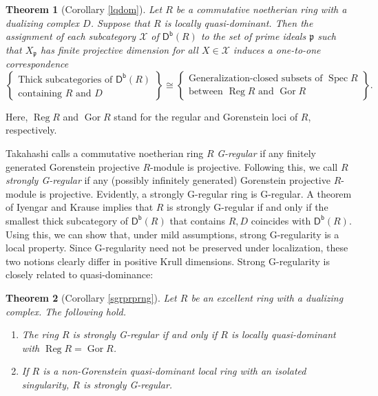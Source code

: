\documentclass{amsart}
\newtheorem{thm}{Theorem}[section]
\theoremstyle{definition}
\theoremstyle{remark}
\numberwithin{equation}{thm}
\def\Db{\operatorname{\mathsf{D^b}}}
\def\gor{\operatorname{Gor}}
\def\p{\mathfrak{p}}
\def\reg{\operatorname{Reg}}
\def\spec{\operatorname{Spec}}
\def\X{\mathcal{X}}
\begin{document}
\begin{thm}[Corollary \ref{lqdom}]\label{main2}
Let $R$ be a commutative noetherian ring with a dualizing complex $D$.
Suppose that $R$ is locally quasi-dominant.
Then the assignment of each subcategory $\X$ of $\Db(R)$ to the set of prime ideals $\p$ such that $X_\p$ has finite projective dimension for all $X\in\X$ induces a one-to-one correspondence
$$
{\left\{
\begin{matrix}
\text{Thick subcategories of $\Db(R)$}\\
\text{containing $R$ and $D$}
\end{matrix}
\right\}}
\cong
{\left\{
\begin{matrix}
\text{Generalization-closed subsets of $\spec R$}\\
\text{between $\reg R$ and $\gor R$}
\end{matrix}
\right\}.}
$$
\end{thm}

\noindent
Here, $\reg R$ and $\gor R$ stand for the regular and Gorenstein loci of $R$, respectively.

Takahashi \cite{T08} calls a commutative noetherian ring $R$ {\em G-regular} if any finitely generated Gorenstein projective $R$-module is projective.
Following this, we call $R$ {\em strongly G-regular} if any (possibly infinitely generated) Gorenstein projective $R$-module is projective.
Evidently, a strongly G-regular ring is G-regular.
A theorem of Iyengar and Krause \cite{IK06} implies that $R$ is strongly G-regular if and only if the smallest thick subcategory of $\Db(R)$ that contains $R,D$ coincides with $\Db(R)$.
Using this, we can show that, under mild assumptions, strong G-regularity is a local property. 
Since G-regularity need not be preserved under localization, these two notions clearly differ in positive Krull dimensions. 
Strong G-regularity is closely related to quasi-dominance:

\begin{thm}[Corollary \ref{sgrprprng}]\label{main3}
Let $R$ be an excellent ring with a dualizing complex.
The following hold.
\begin{enumerate}[\rm(1)]
\item
The ring $R$ is strongly G-regular if and only if $R$ is locally quasi-dominant with $\reg R=\gor R$.
\item
If $R$ is a non-Gorenstein quasi-dominant local ring with an isolated singularity, $R$ is strongly G-regular.
\end{enumerate}
\end{thm}
\end{document}
